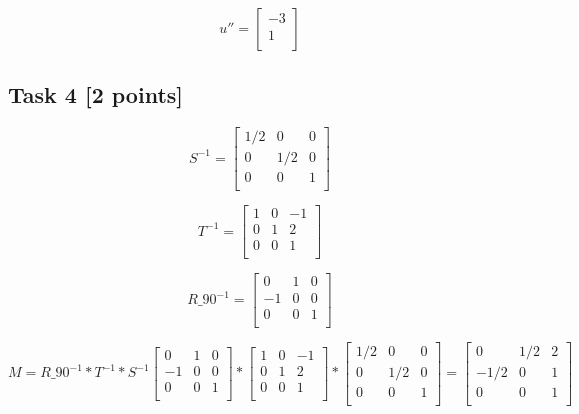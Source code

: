 \documentclass{article}
\begin{document}
\[
    u'' =
    \begin{bmatrix}
        -3 \\
        1  \\
    \end{bmatrix}
\]

\subsection*{Task 4 [2 points]}
\[
    S^{-1} =
    \begin{bmatrix}
        1/2 & 0   & 0 \\
        0   & 1/2 & 0 \\
        0   & 0   & 1 \\
    \end{bmatrix}
\]


\[
    T^{-1} =
    \begin{bmatrix}
        1 & 0 & -1 \\
        0 & 1 & 2  \\
        0 & 0 & 1  \\
    \end{bmatrix}
\]


\[
    R\_90^{-1} =
    \begin{bmatrix}
        0  & 1 & 0 \\
        -1 & 0 & 0 \\
        0  & 0 & 1 \\
    \end{bmatrix}
\]


\[
    M = R\_90^{-1} * T^{-1} * S^{-1}
    \begin{bmatrix}
        0  & 1 & 0 \\
        -1 & 0 & 0 \\
        0  & 0 & 1 \\
    \end{bmatrix}
    *
    \begin{bmatrix}
        1 & 0 & -1 \\
        0 & 1 & 2  \\
        0 & 0 & 1  \\
    \end{bmatrix}
    *
    \begin{bmatrix}
        1/2 & 0   & 0 \\
        0   & 1/2 & 0 \\
        0   & 0   & 1 \\
    \end{bmatrix}
    =
    \begin{bmatrix}
        0    & 1/2 & 2 \\
        -1/2 & 0   & 1 \\
        0    & 0   & 1 \\
    \end{bmatrix}
\]
\end{document}
